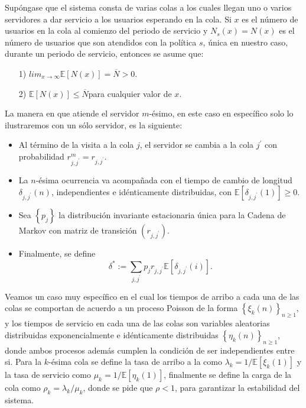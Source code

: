 \documentclass{article}
\newcommand{\esp}{\mathbb{E}}
\numberwithin{equation}{section}
\begin{document}
Sup\'ongase que el sistema consta de varias colas a los cuales llegan uno o varios servidores a dar servicio a los usuarios
esperando en la cola. Si $x$ es el n\'umero de usuarios en la cola al comienzo del periodo de servicio y $N_{s}\left(x\right)=N\left(x\right)$ es el n\'umero de usuarios que son atendidos con la pol\'itica $s$, \'unica en nuestro caso, durante un periodo de servicio, entonces se asume que:
\begin{itemize}
\item[1)]\label{S1}$lim_{x\rightarrow\infty}\esp\left[N\left(x\right)\right]=\overline{N}>0$.
\item[2)]\label{S2}$\esp\left[N\left(x\right)\right]\leq\overline{N}$para cualquier valor de $x$.
\end{itemize}
La manera en que atiende el servidor $m$-\'esimo, en este caso en espec\'ifico solo lo ilustraremos con un s\'olo servidor, es la siguiente:
\begin{itemize}
\item Al t\'ermino de la visita a la cola $j$, el servidor se cambia a la cola $j^{'}$ con probabilidad $r_{j,j^{'}}^{m}=r_{j,j^{'}}$.

\item La $n$-\'esima ocurrencia va acompa\~nada con el tiempo de cambio de longitud $\delta_{j,j^{'}}\left(n\right)$, independientes e id\'enticamente distribuidas, con $\esp\left[\delta_{j,j^{'}}\left(1\right)\right]\geq0$.

\item Sea $\left\{p_{j}\right\}$ la distribuci\'on invariante estacionaria \'unica para la Cadena de Markov con matriz de transici\'on $\left(r_{j,j^{'}}\right)$.

\item Finalmente, se define
\begin{equation}
\delta^{*}:=\sum_{j,j^{'}}p_{j}r_{j,j^{'}}\esp\left[\delta_{j,j^{'}}\left(i\right)\right].
\end{equation}
\end{itemize}

Veamos un caso muy espec\'ifico en el cual los tiempos de arribo a cada una de las colas se comportan de acuerdo a un proceso Poisson de la forma $\left\{\xi_{k}\left(n\right)\right\}_{n\geq1}$, y los tiempos de servicio en cada una de las colas son variables aleatorias distribuidas exponencialmente e id\'enticamente distribuidas $\left\{\eta_{k}\left(n\right)\right\}_{n\geq1}$, donde ambos procesos adem\'as cumplen la condici\'on de ser independientes entre si. Para la $k$-\'esima cola se define la tasa de arribo a la como $\lambda_{k}=1/\esp\left[\xi_{k}\left(1\right)\right]$ y la tasa de servicio como $\mu_{k}=1/\esp\left[\eta_{k}\left(1\right)\right]$, finalmente se define la carga de la cola como $\rho_{k}=\lambda_{k}/\mu_{k}$, donde se pide que $\rho<1$, para garantizar la estabilidad del sistema.\\
\end{document}
